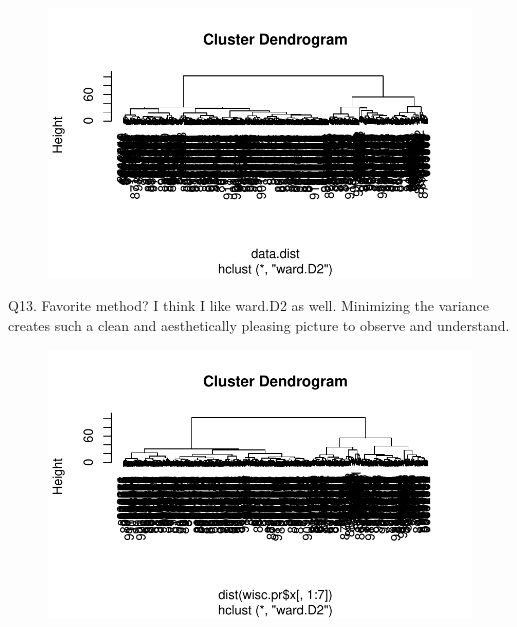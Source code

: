 \documentclass[
  letterpaper,
  DIV=11,
  numbers=noendperiod]{scrartcl}
\newenvironment{Shaded}{\begin{snugshade}}{\end{snugshade}}
\newcommand{\AttributeTok}[1]{\textcolor[rgb]{0.40,0.45,0.13}{#1}}
\newcommand{\DecValTok}[1]{\textcolor[rgb]{0.68,0.00,0.00}{#1}}
\newcommand{\FunctionTok}[1]{\textcolor[rgb]{0.28,0.35,0.67}{#1}}
\newcommand{\NormalTok}[1]{\textcolor[rgb]{0.00,0.23,0.31}{#1}}
\newcommand{\OtherTok}[1]{\textcolor[rgb]{0.00,0.23,0.31}{#1}}
\newcommand{\SpecialCharTok}[1]{\textcolor[rgb]{0.37,0.37,0.37}{#1}}
\newcommand{\StringTok}[1]{\textcolor[rgb]{0.13,0.47,0.30}{#1}}
\begin{document}
\begin{figure}[H]

{\centering \includegraphics{test_files/figure-pdf/unnamed-chunk-18-1.pdf}

}

\end{figure}

Q13. Favorite method? I think I like ward.D2 as well. Minimizing the
variance creates such a clean and aesthetically pleasing picture to
observe and understand.

\begin{Shaded}
\end{Shaded}

\begin{figure}[H]

{\centering \includegraphics{test_files/figure-pdf/unnamed-chunk-19-1.pdf}

}

\end{figure}
\end{document}
